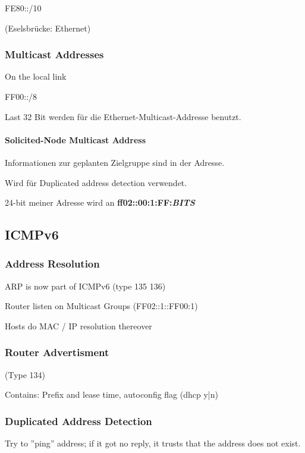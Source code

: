 FE80::/10

(Eselsbrücke: Ethernet)

\subsubsection{Multicast Addresses}

On the local link

FF00::/8

Last 32 Bit werden für die Ethernet-Multicast-Addresse benutzt.

\paragraph{Solicited-Node Multicast Address}

Informationen zur geplanten Zielgruppe sind in der Adresse.

Wird für Duplicated address detection verwendet.


24-bit meiner Adresse wird an \textbf{ff02::00:1:FF:\textit{BITS}}





\subsection{ICMPv6}

\subsubsection{Address Resolution}

ARP is now part of ICMPv6 (type 135 136)

Router listen on Multicast Groups (FF02::1::FF00:1)

Hosts do MAC / IP resolution thereover

\subsubsection{Router Advertisment}

(Type 134)

Contains: Prefix and lease time, autoconfig flag (dhcp y|n)

\subsubsection{Duplicated Address Detection}

Try to ''ping'' address; if it got no reply, it trusts that the address does not exist.

